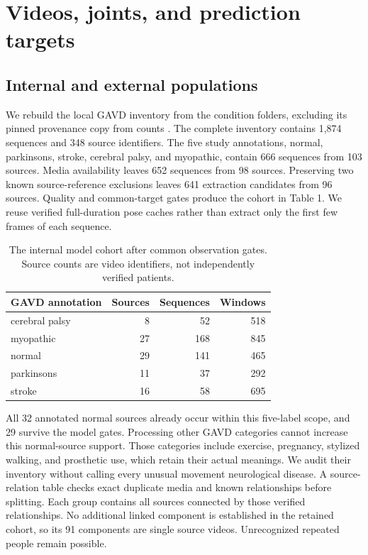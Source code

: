 \documentclass[letterpaper]{article}
\begin{document}
\section{Videos, joints, and prediction targets}

\subsection{Internal and external populations}

We rebuild the local GAVD inventory from the condition folders, excluding its pinned provenance copy from counts \citep{ranjan2025}. The complete inventory contains 1,874 sequences and 348 source identifiers. The five study annotations, normal, parkinsons, stroke, cerebral palsy, and myopathic, contain 666 sequences from 103 sources. Media availability leaves 652 sequences from 98 sources. Preserving two known source-reference exclusions leaves 641 extraction candidates from 96 sources. Quality and common-target gates produce the cohort in Table 1. We reuse verified full-duration pose caches rather than extract only the first few frames of each sequence.

\begin{table}[t]
\centering
\footnotesize
\setlength{\tabcolsep}{3pt}
\begin{tabular}{>{\raggedright\arraybackslash}p{}rrr}
\toprule
GAVD annotation & Sources & Sequences & Windows \\
\midrule
cerebral palsy & 8 & 52 & 518 \\
myopathic & 27 & 168 & 845 \\
normal & 29 & 141 & 465 \\
parkinsons & 11 & 37 & 292 \\
stroke & 16 & 58 & 695 \\
\bottomrule
\end{tabular}
\caption{The internal model cohort after common observation gates. Source counts are video identifiers, not independently verified patients.}
\label{tab:cohort}
\end{table}

All 32 annotated normal sources already occur within this five-label scope, and 29 survive the model gates. Processing other GAVD categories cannot increase this normal-source support. Those categories include exercise, pregnancy, stylized walking, and prosthetic use, which retain their actual meanings. We audit their inventory without calling every unusual movement neurological disease. A source-relation table checks exact duplicate media and known relationships before splitting. Each group contains all sources connected by those verified relationships. No additional linked component is established in the retained cohort, so its 91 components are single source videos. Unrecognized repeated people remain possible.
\end{document}
